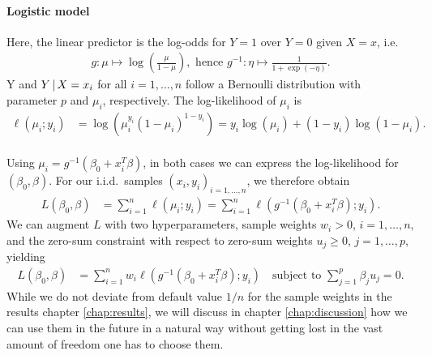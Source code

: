 \paragraph{Logistic model}
Here, the linear predictor is the log-odds for $Y = 1$ over $Y = 0$ given $X = x$, i.e.
\begin{align}
    g: \mu \mapsto \log\left( \frac{\mu}{1 - \mu} \right), \text{ hence } g^{-1}: \eta \mapsto
    \frac{1}{1 + \exp(-\eta)}.
\end{align}
Y and $Y \,|\, X = x_i$ for all $i = 1, \ldots, n$ follow a Bernoulli distribution with parameter 
$p$ and $\mu_i$, respectively. The log-likelihood of $\mu_i$ is
\begin{align}
    \ell(\mu_i; y_i) &= \log\left( \mu_i^{y_i} (1 - \mu_i)^{1 - y_i} \right) 
    = y_i \log(\mu_i) + (1 - y_i) \log(1 - \mu_i). 
\end{align}

\paragraph{}
Using $\mu_i = g^{-1}(\beta_0 + x_i^T \beta)$, in both cases we can express the 
log-likelihood 
for $(\beta_0, \beta)$. For our i.i.d.\ samples $(x_i, y_i)_{i = 1, \ldots, n}$, we therefore obtain 
\begin{align}
    L(\beta_0, \beta) &= \sum_{i=1}^n \ell(\mu_i; y_i) 
    = \sum_{i=1}^n \ell\left( g^{-1}\left( \beta_0 + x_i^T \beta \right); y_i \right).
\end{align}
We can augment $L$ with two hyperparameters, sample weights $w_i > 0$, $i = 1, \ldots, n$, and the 
zero-sum constraint with respect to zero-sum weights $u_j \geq 0$, $j = 1, \ldots, p$, yielding 
\begin{align} \label{eq:loss-glm-no-lasso}
    L(\beta_0, \beta) &= \sum_{i=1}^n w_i \ell\left( g^{-1}\left( \beta_0 + x_i^T \beta \right); 
    y_i \right) \quad \text{subject to } \sum_{j=1}^p \beta_j u_j = 0.
\end{align}
While we do not deviate from default value $1/n$ for the sample weights in the results chapter 
\ref{chap:results}, we will discuss in chapter \ref{chap:discussion} how we can use them in the 
future in a natural way without getting lost in the vast amount of freedom one has to choose them.

